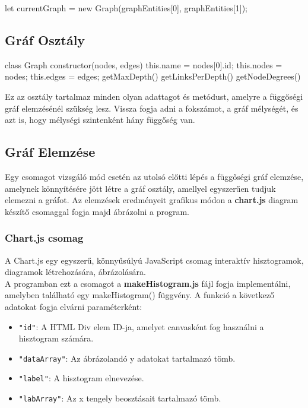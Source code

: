 \begin{cpp}
let currentGraph = new Graph(graphEntities[0], graphEntities[1]);
\end{cpp}

\pagebreak

\subsection{Gráf Osztály}

\begin{cpp}
class Graph{
	constructor(nodes, edges){
		this.name = nodes[0].id;
		this.nodes = nodes;
		this.edges = edges;
	}
	getMaxDepth(){
	}
	getLinksPerDepth(){
	}
	getNodeDegrees(){
	}	
}
\end{cpp}

Ez az osztály tartalmaz minden olyan adattagot és metódust, amelyre a függőségi gráf elemzésénél szükség lesz. Vissza fogja adni a fokszámot, a gráf mélységét, és azt is, hogy mélységi szintenként hány függőség van.

\subsection{Gráf Elemzése}

Egy csomagot vizsgáló mód esetén az utolsó előtti lépés a függőségi gráf elemzése, amelynek könnyítésére jött létre a gráf osztály, amellyel egyszerűen tudjuk elemezni a gráfot. Az elemzések eredményeit grafikus módon a \textbf{chart.js} diagram készítő csomaggal fogja majd ábrázolni a program.

\subsubsection{Chart.js csomag}

A Chart.js egy egyszerű, könnyűsúlyú JavaScript csomag interaktív hisztogramok, diagramok létrehozására, ábrázolására.\\

A programban ezt a csomagot a \textbf{makeHistogram.js} fájl fogja implementálni, amelyben található egy makeHistogram() függvény. A funkció a következő adatokat fogja elvárni paraméterként: 

\begin{itemize}
	\item \texttt{"id"}: A HTML Div elem ID-ja, amelyet canvasként fog használni a hisztogram számára.
	\item \texttt{"dataArray"}: Az ábrázolandó y adatokat tartalmazó tömb.
	\item \texttt{"label"}: A hisztogram elnevezése.
	\item \texttt{"labArray"}: Az x tengely beosztásait tartalmazó tömb.
\end{itemize} 

